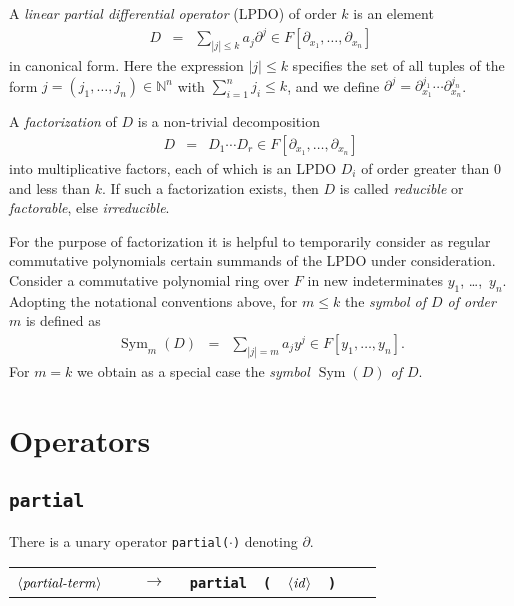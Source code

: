 \documentclass[a4paper]{article}
\newcommand{\N}{\mathbb{N}}
\newcommand{\Sym}{\operatorname{Sym}}
\newcommand{\txt}{\textrm}
\newenvironment{ebnf}{\begin{tabular}{rcll}}{\end{tabular}}
\newcommand{\ebnfvara}[1]{$\left\langle \text{\textit{#1}}\right\rangle$\ \ }
\newcommand{\ebnfterm}[1]{\txt{\textbf{\texttt{#1}}}\ \ }
\newcommand{\ebnfrule}[2]{{#1}&$\ \ \rightarrow\ \ $&{#2}&\\}
\begin{document}
A \emph{linear partial differential operator} (LPDO) of order $k$ is
an element
\begin{eqnarray*}
  D &=& \sum_{|j| \leq k} a_j \partial^j\in
  F[\partial_{x_1},\dots,\partial_{x_n}]
\end{eqnarray*}
in canonical form. Here the expression $|j| \leq k$ specifies the set
of all tuples of the form $j = (j_1,\dots,j_n) \in \N^n$ with
$\sum_{i=1}^n j_i \leq k$, and we define $\partial^j
= \partial_{x_1}^{j_1} \cdots \partial_{x_n}^{j_n}$.

A \emph{factorization} of $D$ is a non-trivial decomposition
\begin{eqnarray*}
D &=& D_1 \cdots D_r\in F[\partial_{x_1},\dots,\partial_{x_n}]
\end{eqnarray*}
into multiplicative factors, each of which is an LPDO $D_i$ of order
greater than $0$ and less than $k$. If such a factorization exists,
then $D$ is called \emph{reducible} or \emph{factorable}, else
\emph{irreducible}.

For the purpose of factorization it is helpful to temporarily consider
as regular commutative polynomials certain summands of the LPDO under
consideration. Consider a commutative polynomial ring over $F$ in new
indeterminates $y_1$, \dots,~$y_n$. Adopting the notational
conventions above, for $m\leq k$ the \emph{symbol of $D$ of order $m$}
is defined as
\begin{eqnarray*}
  \Sym_m(D) &=& \sum_{|j| = m} a_j y^j\in F[y_1,\dots,y_n].
\end{eqnarray*}
For $m=k$ we obtain as a special case the \emph{symbol $\Sym(D)$ of
  $D$}.

\section{Operators}

\subsection{\texttt{partial}}
There is a unary operator \texttt{partial($\cdot$)} denoting
$\partial$.

\begin{center}
  \begin{ebnf}
    \ebnfrule{\ebnfvara{partial-term}}{\ebnfterm{partial}\ebnfterm{(}\ebnfvara{id}\ebnfterm{)}}
  \end{ebnf}
\end{center}
\end{document}
